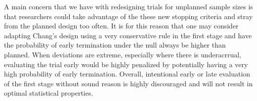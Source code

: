 \documentclass[12pt]{report}\usepackage[]{graphicx}\usepackage[]{color}
\newlength{\li}\setlength{\li}{14.48pt}
\newlength{\di}\setlength{\di}{-3.5mm}
\begin{document}
\indent A main concern that we have with redesigning trials for unplanned sample sizes is that researchers could take advantage of the these new stopping criteria and stray from the planned design too often. It is for this reason that one may consider adapting Chang's design using a very conservative rule in the first stage and have the probability of early termination under the null always be higher than planned. When deviations are extreme, especially where there is underacrrual, evaluating the trial early would be highly penalized by potentially having a very high probability of early termination. Overall, intentional early or late evaluation of the first stage without sound reason is highly discouraged and will not result in optimal statistical properties. 







%

		
\end{document}
